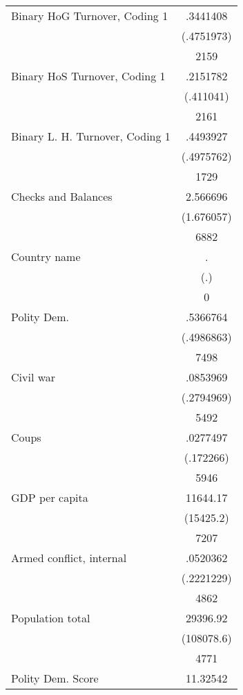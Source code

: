 {\begin{longtable}{l*{1}{c}}
Binary HoG Turnover, Coding 1&    .3441408\\
                    &  (.4751973)\\
                    &        2159\\
Binary HoS Turnover, Coding 1&    .2151782\\
                    &   (.411041)\\
                    &        2161\\
Binary L. H. Turnover, Coding 1&    .4493927\\
                    &  (.4975762)\\
                    &        1729\\
Checks and Balances &    2.566696\\
                    &  (1.676057)\\
                    &        6882\\
Country name        &           .\\
                    &         (.)\\
                    &           0\\
Polity Dem.         &    .5366764\\
                    &  (.4986863)\\
                    &        7498\\
Civil war           &    .0853969\\
                    &  (.2794969)\\
                    &        5492\\
Coups               &    .0277497\\
                    &   (.172266)\\
                    &        5946\\
GDP per capita      &    11644.17\\
                    &   (15425.2)\\
                    &        7207\\
Armed conflict, internal&    .0520362\\
                    &  (.2221229)\\
                    &        4862\\
Population total    &    29396.92\\
                    &  (108078.6)\\
                    &        4771\\
Polity Dem. Score   &    11.32542\\

\end{longtable}}
